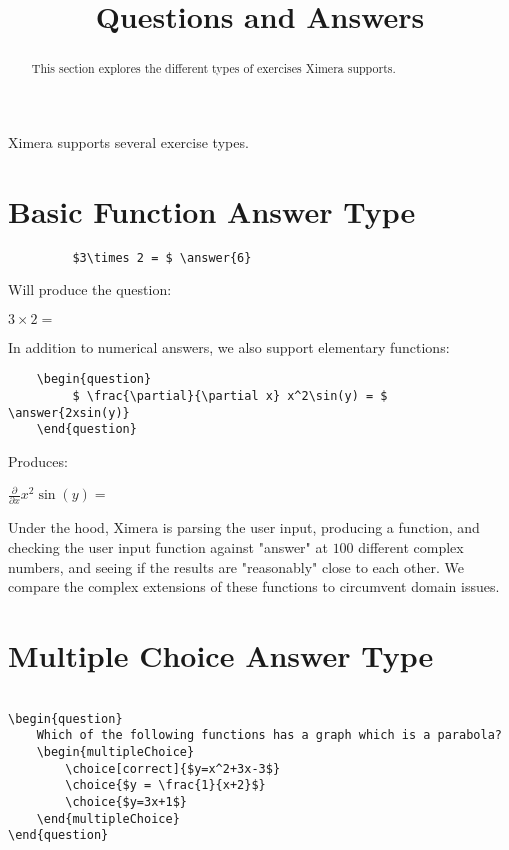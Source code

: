 \documentclass{ximera}
\title{Questions and Answers}
\begin{document}
	\begin{abstract}
		This section explores the different types of exercises Ximera supports. 
	\end{abstract}

\maketitle
	
Ximera supports several exercise types.
	
	
\section{Basic Function Answer Type}	
\begin{verbatim}
         $3\times 2 = $ \answer{6}
\end{verbatim}

Will produce the question:

\begin{question}
            $3\times 2 = $ 
\end{question}

In addition to numerical answers, we also support elementary functions:

\begin{verbatim}
    \begin{question}
         $ \frac{\partial}{\partial x} x^2\sin(y) = $ \answer{2xsin(y)}
    \end{question}
\end{verbatim}

Produces:

  \begin{question}
       $ \frac{\partial}{\partial x} x^2\sin(y) = $ 
  \end{question}
    
Under the hood, Ximera is parsing the user input, producing a function, and checking the user input function against "answer" at 
$100$ different complex numbers, and seeing if the results are "reasonably" close to each other.  
We compare the complex extensions of these functions to circumvent domain issues.

\section{Multiple Choice Answer Type}

\begin{verbatim}

\begin{question}
	Which of the following functions has a graph which is a parabola?
	\begin{multipleChoice}
		\choice[correct]{$y=x^2+3x-3$}
		\choice{$y = \frac{1}{x+2}$}
		\choice{$y=3x+1$}
	\end{multipleChoice}
\end{question}
\end{verbatim}
\end{document}
